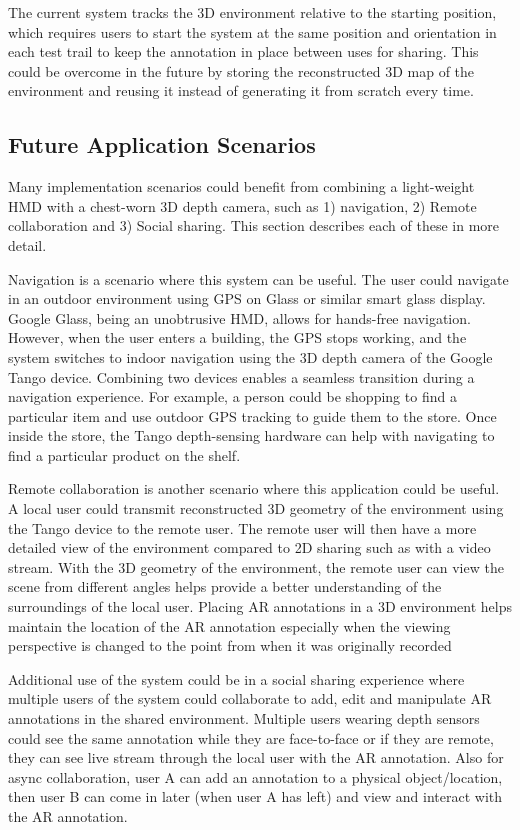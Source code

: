 The current system tracks the 3D environment relative to the starting position, which requires users to start the system at the same position and orientation in each test trail to keep the annotation in place between uses for sharing. This could be overcome in the future by storing the reconstructed 3D map of the environment and reusing it instead of generating it from scratch every time. 

\subsection{Future Application Scenarios}

Many implementation scenarios could benefit from combining a light-weight HMD with a chest-worn 3D depth camera, such as 1) navigation, 2) Remote collaboration and 3) Social sharing. This section describes each of these in more detail.

Navigation is a scenario where this system can be useful. The user could navigate in an outdoor environment using GPS on Glass or similar smart glass display. Google Glass, being an unobtrusive HMD, allows for hands-free navigation. However, when the user enters a building, the GPS stops working, and the system switches to indoor navigation using the 3D depth camera of the Google Tango device. Combining two devices enables a seamless transition during a navigation experience. For example, a person could be shopping to find a particular item and use outdoor GPS tracking to guide them to the store. Once inside the store, the Tango depth-sensing hardware can help with navigating to find a particular product on the shelf.

Remote collaboration is another scenario where this application could be useful. A local user could transmit reconstructed 3D geometry of the environment using the Tango device to the remote user. The remote user will then have a more detailed view of the environment compared to 2D sharing such as with a video stream. With the 3D geometry of the environment, the remote user can view the scene from different angles helps provide a better understanding of the surroundings of the local user. Placing AR annotations in a 3D environment helps maintain the location of the AR annotation especially when the viewing perspective is changed to the point from when it was originally recorded

Additional use of the system could be in a social sharing experience where multiple users of the system could collaborate to add, edit and manipulate AR annotations in the shared environment. Multiple users wearing depth sensors could see the same annotation while they are face-to-face or if they are remote, they can see live stream through the local user with the AR annotation. Also for async collaboration, user A can add an annotation to a physical object/location, then user B can come in later (when user A has left) and view and interact with the AR annotation.


